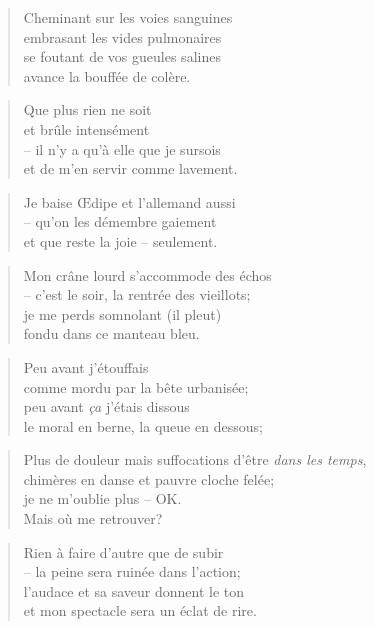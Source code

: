   \begin{verse}
    Cheminant sur les voies sanguines\\
    embrasant les vides pulmonaires\\
    se foutant de vos gueules salines\\
    avance la bouffée de colère.
  \end{verse}
  \begin{verse}
    Que plus rien ne soit\\
    et brûle intensément\\
    -- il n’y a qu’à elle que je sursois\\
    et de m’en servir comme lavement.
  \end{verse}
  \begin{verse}
    Je baise Œdipe et l’allemand aussi\\
    -- qu’on les démembre gaiement\\
    et que reste la joie -- seulement.
  \end{verse}
  \begin{verse}
    Mon crâne lourd s’accommode des échos\\
    -- c’est le soir, la rentrée des vieillots;\\
    je me perds somnolant (il pleut)\\
    fondu dans ce manteau bleu.
  \end{verse}
  \begin{verse}
    Peu avant j’étouffais\\
    comme mordu par la bête urbanisée;\\
    peu avant \emph{ça} j’étais dissous\\
    le moral en berne, la queue en dessous;
  \end{verse}
  \begin{verse}
    Plus de douleur mais suffocations d’être \emph{dans les temps},\\
    chimères en danse et pauvre cloche felée;\\
    je ne m’oublie plus -- OK.\\
    Mais où me retrouver?
  \end{verse}
  \begin{verse}
    Rien à faire d’autre que de subir\\
    -- la peine sera ruinée dans l’action;\\
    l’audace et sa saveur donnent le ton\\
    et mon spectacle sera un éclat de rire.
  \end{verse}

